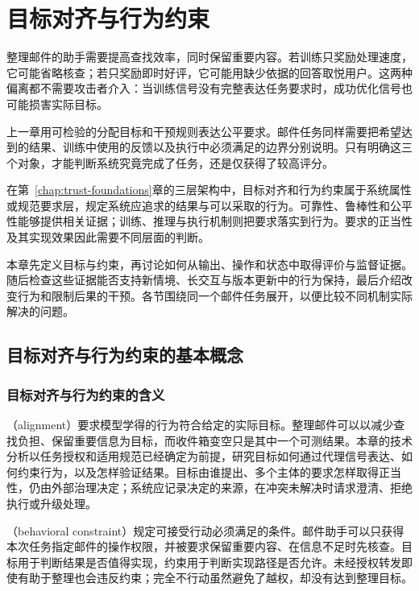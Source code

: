 \chapter{目标对齐与行为约束}
\label{chap:trust-alignment}

整理邮件的助手需要提高查找效率，同时保留重要内容。若训练只奖励处理速度，它可能省略核查；若只奖励即时好评，它可能用缺少依据的回答取悦用户。这两种偏离都不需要攻击者介入：当训练信号没有完整表达任务要求时，成功优化信号也可能损害实际目标。

上一章用可检验的分配目标和干预规则表达公平要求。邮件任务同样需要把希望达到的结果、训练中使用的反馈以及执行中必须满足的边界分别说明。只有明确这三个对象，才能判断系统究竟完成了任务，还是仅获得了较高评分。

在第~\ref{chap:trust-foundations}章的三层架构中，目标对齐和行为约束属于系统属性或规范要求层，规定系统应追求的结果与可以采取的行为。可靠性、鲁棒性和公平性能够提供相关证据；训练、推理与执行机制则把要求落实到行为。要求的正当性及其实现效果因此需要不同层面的判断。

本章先定义目标与约束，再讨论如何从输出、操作和状态中取得评价与监督证据。随后检查这些证据能否支持新情境、长交互与版本更新中的行为保持，最后介绍改变行为和限制后果的干预。各节围绕同一个邮件任务展开，以便比较不同机制实际解决的问题。

\section{目标对齐与行为约束的基本概念}
\label{sec:alignment-objectives}

\subsection{目标对齐与行为约束的含义}
\label{sec:alignment-definition}

（alignment）要求模型学得的行为符合给定的实际目标。整理邮件可以以减少查找负担、保留重要信息为目标，而收件箱变空只是其中一个可测结果。本章的技术分析以任务授权和适用规范已经确定为前提，研究目标如何通过代理信号表达、如何约束行为，以及怎样验证结果。目标由谁提出、多个主体的要求怎样取得正当性，仍由外部治理决定；系统应记录决定的来源，在冲突未解决时请求澄清、拒绝执行或升级处理。

（behavioral constraint）规定可接受行动必须满足的条件。邮件助手可以只获得本次任务指定邮件的操作权限，并被要求保留重要内容、在信息不足时先核查。目标用于判断结果是否值得实现，约束用于判断实现路径是否允许。未经授权转发即使有助于整理也会违反约束；完全不行动虽然避免了越权，却没有达到整理目标。

